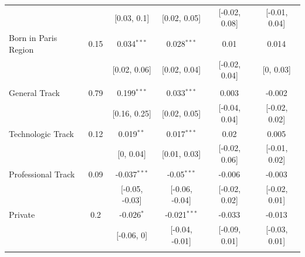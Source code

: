 \begin{table}[!htp]
{{\begin{threeparttable}
\begin{tabular}[t]{lccccc}
\hspace{1em}\hspace{1em} &  & {}[0.03, 0.1] & {}[0.02, 0.05] & {}[-0.02, 0.08] & {}[-0.01, 0.04]\\
\hspace{1em}\hspace{1em}Born in Paris Region & 0.15 & 0.034$^{***}$ & 0.028$^{***}$ & 0.01$^{}$ & 0.014$^{}$\\
\hspace{1em}\hspace{1em} &  & {}[0.02, 0.06] & {}[0.02, 0.04] & {}[-0.02, 0.04] & {}[0, 0.03]\\
\addlinespace[0.3em]
\multicolumn{6}{l}{\textit{High-School}}\\
\hspace{1em}\hspace{1em}General Track & 0.79 & 0.199$^{***}$ & 0.033$^{***}$ & 0.003$^{}$ & -0.002$^{}$\\
\hspace{1em}\hspace{1em} &  & {}[0.16, 0.25] & {}[0.02, 0.05] & {}[-0.04, 0.04] & {}[-0.02, 0.02]\\
\hspace{1em}\hspace{1em}Technologic Track & 0.12 & 0.019$^{**}$ & 0.017$^{***}$ & 0.02$^{}$ & 0.005$^{}$\\
\hspace{1em}\hspace{1em} &  & {}[0, 0.04] & {}[0.01, 0.03] & {}[-0.02, 0.06] & {}[-0.01, 0.02]\\
\hspace{1em}\hspace{1em}Professional Track & 0.09 & -0.037$^{***}$ & -0.05$^{***}$ & -0.006$^{}$ & -0.003$^{}$\\
\hspace{1em}\hspace{1em} &  & {}[-0.05, -0.03] & {}[-0.06, -0.04] & {}[-0.02, 0.02] & {}[-0.02, 0.01]\\
\hspace{1em}\hspace{1em}Private & 0.2 & -0.026$^{*}$ & -0.021$^{***}$ & -0.033$^{}$ & -0.013$^{}$\\
\hspace{1em}\hspace{1em} &  & {}[-0.06, 0] & {}[-0.04, -0.01] & {}[-0.09, 0.01] & {}[-0.03, 0.01]\\
\addlinespace[0.3em]
\hline
\addlinespace[0.3em]

\end{tabular}
\end{threeparttable}}}
\end{table}
